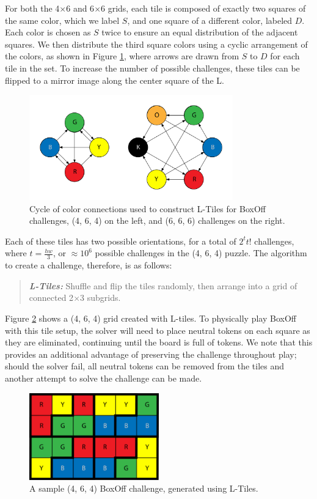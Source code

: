\documentclass[journal]{IEEEtran}
\begin{document}
For both the 4$\times$6 and 6$\times$6 grids, each tile is composed of exactly two squares of the same color, which we label $S$, and one square of a different color, labeled $D$. Each color is chosen as $S$ twice to ensure an equal distribution of the adjacent squares. We then distribute the third square colors using a cyclic arrangement of the colors, as shown in Figure \ref{fig:boxoffcycle}, where arrows are drawn from $S$ to $D$ for each tile in the set.  To increase the number of possible challenges, these tiles can be flipped to a mirror image along the center square of the L.

\begin{figure}[t]
\centering
\includegraphics[width=8.8cm]{figure5.png}
\caption{Cycle of color connections used to construct L-Tiles for BoxOff challenges, (4, 6, 4) on the left, and (6, 6, 6) challenges on the right.}
\label{fig:boxoffcycle}
\end{figure}

Each of these tiles has two possible orientations, for a total of $2^{t}t!$ challenges, where $t=\frac{hw}{3}$, or $\approx 10^{6}$ possible challenges in the (4, 6, 4) puzzle. 
The algorithm to create a challenge, therefore, is as follows:

\begin{quote}
    {\it \bf L-Tiles:} Shuffle and flip the tiles randomly, then arrange into a grid of connected 2$\times$3 subgrids. 
\end{quote}

Figure \ref{fig:boxofftiles} shows a (4, 6, 4) grid created with L-tiles. To physically play BoxOff with this tile setup, the solver will need to place neutral tokens on each square as they are eliminated, continuing until the board is full of tokens. We note that this provides an additional advantage of preserving the challenge throughout play; should the solver fail, all neutral tokens can be removed from the tiles and another attempt to solve the challenge can be made.

\begin{figure}[t]
\centering
\includegraphics[width=5.6cm]{figure6.png}
\caption{A sample (4, 6, 4) BoxOff challenge, generated using L-Tiles. }
\label{fig:boxofftiles}
\end{figure}
\end{document}
